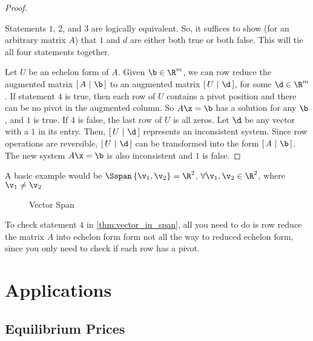 \begin{proof}
  \label{prf:vector_in_span}

  Statements $1$, $2$, and $3$ are logically equivalent. So, it suffices to show
  (for an arbitrary matrix $A$) that $1$ and $d$ are either both true or both
  false. This will tie all four statements together.

  Let $U$ be an echelon form of $A$. Given $\b \in  \R^m$, we can row reduce the
  augmented matrix $[\,A~\vert~\b\,]$ to an augmented matrix $[\,U~\vert~\d\,]$,
  for some $\d \in \R^m$. If statement $4$ is true, then each row of $U$
  contains a pivot position and there can be no pivot in the augmented column.
  So $A\x = \b$ has a solution for any $\b$, and $1$ is true. If $4$ is false,
  the last row of $U$ is all zeros. Let $\d$ be any vector with a $1$ in its
  entry. Then, $[\,U~\vert~\d\,]$ represents an inconsistent system. Since row
  operations are reversible, $[\,U~\vert~\d\,]$ can be transformed into the form
  $[\,A~\vert~\b\,]$. The new system $A\x = \b$ is also inconsistent and $1$ is
  false.
\end{proof}

\begin{example}
  \label{exm:vector_in_span}

  A basic example would be $\Sspan\left\{\v_1, \v_2\right\} = \R^2$, $\forall
  \v_1, \v_2 \in \R^2$, where $\v_1 \ne \v_2$
  \begin{figure}[H]
    \centering
    \caption{Vector Span}
    \label{fig:vector_span}
  \end{figure}
\end{example}

\begin{note}
  \label{nte:vector_in_span}

  To check statement $4$ in \cref{thm:vector_in_span}, all you need to do is row
  reduce the matrix $A$ into echelon form form not all the way to reduced
  echelon form, since you only need to check if each row has a pivot.
\end{note}


\section{Applications}
\label{sec:applications}

\subsection{Equilibrium Prices}
\label{sub_sec:equilibrium_prices}

